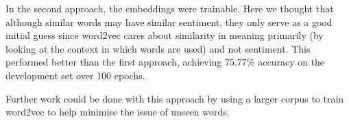 \documentclass{article} %
\begin{document}
In the second approach, the embeddings were trainable. Here we thought that although similar words may have similar sentiment, they only serve as a good initial guess since word2vec cares about similarity in meaning primarily (by looking at the context in which words are used) and not sentiment. This performed better than the first approach, achieving $75.77\%$ accuracy on the development set over 100 epochs.

Further work could be done with this approach by using a larger corpus to train word2vec to help minimise the issue of unseen words. 

{}

\end{document}
